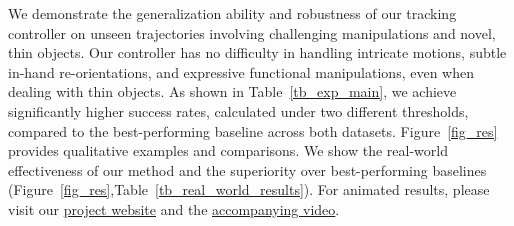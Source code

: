 
        
 







We demonstrate the generalization ability and robustness of our tracking controller on unseen trajectories involving challenging manipulations and novel, thin objects. Our controller has no difficulty in handling intricate motions, subtle in-hand re-orientations, and expressive functional manipulations, even when dealing with thin objects. 
As shown in Table~\ref{tb_exp_main}, we achieve significantly higher success rates, calculated under two different thresholds, compared to the best-performing baseline across both datasets. Figure~\ref{fig_res} provides qualitative examples and comparisons. We show the real-world effectiveness of our method and the superiority over best-performing baselines (Figure~\ref{fig_res},Table~\ref{tb_real_world_results}). For animated results, please visit our \href{https://projectwebsite7.github.io/gene-dex-manip/}{project website} and the \href{https://projectwebsite7.github.io/gene-dex-manip/static/videos-lowres/video_7.mp4}{accompanying video}.



